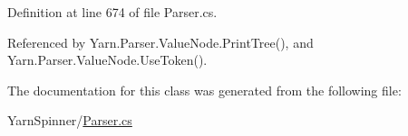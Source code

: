 Definition at line 674 of file Parser.\-cs.



Referenced by Yarn.\-Parser.\-Value\-Node.\-Print\-Tree(), and Yarn.\-Parser.\-Value\-Node.\-Use\-Token().



The documentation for this class was generated from the following file\-:\begin{DoxyCompactItemize}
\item 
Yarn\-Spinner/\hyperlink{a00295}{Parser.\-cs}\end{DoxyCompactItemize}
